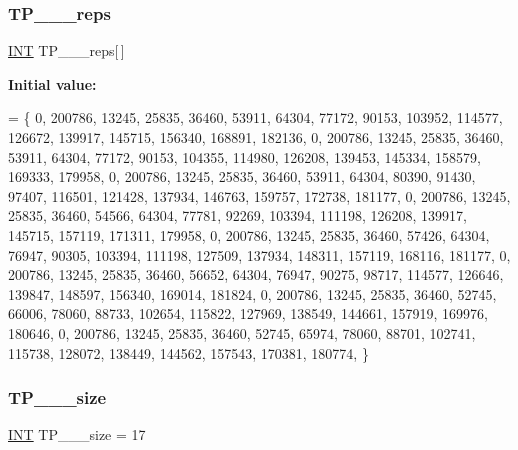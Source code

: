 \mbox{\label{data___t_p_8_c_ab6eae0904bc3a5c5bb88e267aaca5edb}} 
\subsubsection{\texorpdfstring{T\+P\+\_\+\_\+\_\+reps}{TP\_2\_4\_reps}}
{\footnotesize\ttfamily \mbox{\hyperlink{galois_8h_a09fddde158a3a20bd2dcadb609de11dc}{I\+NT}} T\+P\+\_\+\_\+\_\+reps\mbox{[}$\,$\mbox{]}}

{\bfseries Initial value\+:}
\begin{DoxyCode}
= \{
    0, 200786, 13245, 25835, 36460, 53911, 64304, 77172, 90153, 103952, 114577, 126672, 139917, 145715, 
      156340, 168891, 182136, 
    0, 200786, 13245, 25835, 36460, 53911, 64304, 77172, 90153, 104355, 114980, 126208, 139453, 145334, 
      158579, 169333, 179958, 
    0, 200786, 13245, 25835, 36460, 53911, 64304, 80390, 91430, 97407, 116501, 121428, 137934, 146763, 
      159757, 172738, 181177, 
    0, 200786, 13245, 25835, 36460, 54566, 64304, 77781, 92269, 103394, 111198, 126208, 139917, 145715, 
      157119, 171311, 179958, 
    0, 200786, 13245, 25835, 36460, 57426, 64304, 76947, 90305, 103394, 111198, 127509, 137934, 148311, 
      157119, 168116, 181177, 
    0, 200786, 13245, 25835, 36460, 56652, 64304, 76947, 90275, 98717, 114577, 126646, 139847, 148597, 
      156340, 169014, 181824, 
    0, 200786, 13245, 25835, 36460, 52745, 66006, 78060, 88733, 102654, 115822, 127969, 138549, 144661, 
      157919, 169976, 180646, 
    0, 200786, 13245, 25835, 36460, 52745, 65974, 78060, 88701, 102741, 115738, 128072, 138449, 144562, 
      157543, 170381, 180774, 
\}
\end{DoxyCode}
\mbox{\label{data___t_p_8_c_aeab15dbc2a6b08bfbbbd35ee0fbd97bd}} 
\subsubsection{\texorpdfstring{T\+P\+\_\+\_\+\_\+size}{TP\_2\_4\_size}}
{\footnotesize\ttfamily \mbox{\hyperlink{galois_8h_a09fddde158a3a20bd2dcadb609de11dc}{I\+NT}} T\+P\+\_\+\_\+\_\+size = 17}

